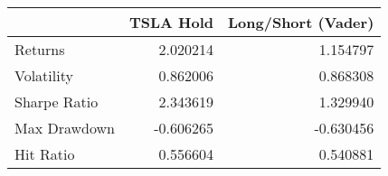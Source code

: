 \begin{tabular}{lrr}
\toprule
{} &  TSLA Hold &  Long/Short (Vader) \\
\midrule
Returns      &   2.020214 &            1.154797 \\
Volatility   &   0.862006 &            0.868308 \\
Sharpe Ratio &   2.343619 &            1.329940 \\
Max Drawdown &  -0.606265 &           -0.630456 \\
Hit Ratio    &   0.556604 &            0.540881 \\
\bottomrule
\end{tabular}
